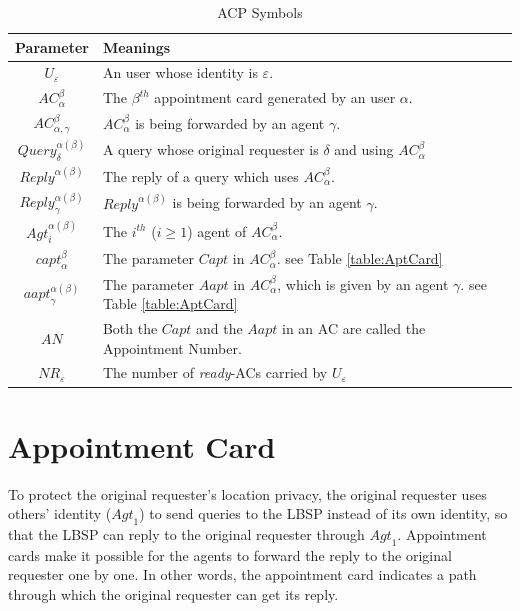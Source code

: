 \begin{table} [hbtp]
\caption{ACP Symbols}
\label{table:ACPSymbols}
\centering
\tabulinesep=2mm
\begin{tabu}{|c|l|} \hline 
Parameter & Meanings \\ \hline 
${U}_{\varepsilon}$ & An user whose identity is $\varepsilon$. \\ \hline 
${AC}_{\alpha}^{\beta}$ & The $\beta^{th}$ appointment card generated by an user $\alpha$. \\ \hline 
${AC}_{{\alpha},{\gamma}}^{\beta}$ & ${AC}_{\alpha}^{\beta}$ is being forwarded by an agent $\gamma$. \\ \hline 
${Query}_{\delta}^{{\alpha}\left({\beta}\right)}$ & A query whose original requester is $\delta$ and using ${AC}_{\alpha}^{\beta}$ \\ \hline 
${{Reply}}^{{\alpha}\left({\beta}\right)}$ & The reply of a query which uses ${AC}_{\alpha}^{\beta}$. \\ \hline 
${{Reply}}_{\gamma}^{{\alpha}\left({\beta}\right)}$ & ${Reply}^{\alpha\left(\beta\right)}$ is being forwarded by an agent $\gamma$. \\ \hline 
${{Agt}}_{i}^{{\alpha}\left({\beta}\right)}$ & The $i^{th}$ ($i\geq1$) agent of ${AC}_{\alpha}^{\beta}$. \\ \hline 
${{capt}}_{\alpha}^{\beta}$ & The parameter $Capt$ in ${AC}_\alpha^\beta$. see Table \ref{table:AptCard} \\ \hline 
${{aapt}}_{\gamma}^{{\alpha}\left({\beta}\right)}$ & The parameter $Aapt$ in ${AC}_{\alpha}^{\beta}$, which is given by an agent $\gamma$. see Table \ref{table:AptCard} \\ \hline 
$AN$ & Both the $Capt$ and the $Aapt$ in an AC are called the Appointment Number. \\ \hline 
${NR}_{\varepsilon}$ & The number of \textit{ready}-ACs carried by ${U}_{\varepsilon}$ \\ \hline 
\end{tabu}
\end{table}

\section{Appointment Card}

\noindent To protect the original requester's location privacy, the original requester uses others' identity (${Agt}_1$) to send queries to the LBSP instead of its own identity, so that the LBSP can reply to the original requester through ${Agt}_1$. Appointment cards make it possible for the agents to forward the reply to the original requester one by one. In other words, the appointment card indicates a path through which the original requester can get its reply. 

